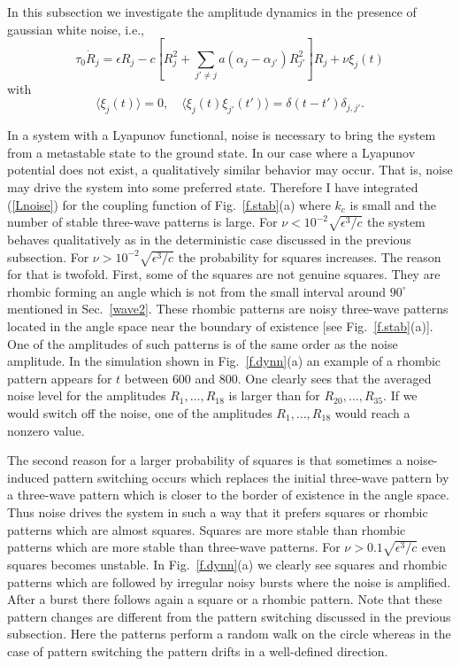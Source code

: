 In this subsection we investigate the amplitude dynamics 
in the presence of gaussian white noise, i.e.,
\begin{equation}
  \tau_0\dot{R}_j=\epsilon R_j-c\left[R_j^2+\sum\limits_{j'\not=j}
   a(\alpha_j-\alpha_{j'})R_{j'}^2\right]R_j+\nu\xi_j(t)
  \label{Lnoise}
\end{equation}
with
\begin{equation}
  \langle\xi_j(t)\rangle=0,\quad 
   \langle\xi_j(t)\xi_{j'}(t')\rangle=\delta(t-t')\delta_{j,j'}.
  \label{n.prop}
\end{equation}

In a system with a Lyapunov functional, noise is necessary to bring
the system from a metastable state to the ground state. In our case
where a Lyapunov potential does not exist, a qualitatively similar
behavior may occur. That is, noise may drive the system into some
preferred state. Therefore I have integrated (\ref{Lnoise}) for the
coupling function of Fig.~\ref{f.stab}(a) where $k_c$ is small and
the number of stable three-wave patterns is large. For
$\nu<10^{-2}\sqrt{\epsilon^3/c}$ the system behaves qualitatively as
in the deterministic case discussed in the previous subsection. For
$\nu>10^{-2}\sqrt{\epsilon^3/c}$ the probability for squares
increases. The reason for that is twofold. First, some of the squares
are not genuine squares. They are rhombic forming an angle which is
not from the small interval around $90^\circ$ mentioned in
Sec.~\ref{wave2}. These rhombic patterns are noisy three-wave
patterns located in the angle space near the boundary of existence
[see Fig.~\ref{f.stab}(a)]. One of the amplitudes of such patterns is
of the same order as the noise amplitude. In the simulation shown in 
Fig.~\ref{f.dynn}(a) an example of a rhombic pattern appears for $t$
between $600$ and $800$. One clearly sees that the averaged noise
level for the amplitudes $R_1,\ldots,R_{18}$ is larger than for
$R_{20},\ldots,R_{35}$. If we would switch off the noise, one of the
amplitudes $R_1,\ldots,R_{18}$ would reach a nonzero value.  

The second reason for a larger probability of squares is that
sometimes a noise-induced pattern switching occurs which replaces the
initial three-wave pattern by a three-wave pattern which is closer to
the border of existence in the angle space. Thus noise drives the
system in such a way that it prefers squares or rhombic patterns
which are almost squares. Squares are more stable than rhombic
patterns which are more stable than three-wave patterns. For
$\nu>0.1\sqrt{\epsilon^3/c}$ even squares becomes unstable. In
Fig.~\ref{f.dynn}(a) we clearly see squares and rhombic patterns
which are followed by irregular noisy bursts where the noise is
amplified.  After a burst there follows again a square or a rhombic
pattern. Note that these pattern changes are different from the
pattern switching discussed in the previous subsection. Here the
patterns perform a random walk on the circle whereas in the case of
pattern switching the pattern drifts in a well-defined direction.

